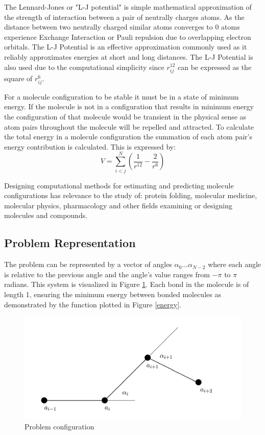 \documentclass[11pt]{article}
\begin{document}
    \par The Lennard-Jones or "L-J potential" is simple mathematical approximation of the strength of interaction between a pair of neutrally charges atoms. As the distance between two neutrally charged similar atoms converges to 0 atoms experience Exchange Interaction or Pauli repulsion due to overlapping electron orbitals. The L-J Potential is an effective approximation commonly used as it reliably approximates energies at short and long distances. The L-J Potential is also used due to the computational simplicity since $r_{ij}^{12}$ can be expressed as the square of $r_{ij}^6$.
    
    \par For a molecule configuration to be stable it must be in a state of minimum energy. If the molecule is not in a configuration that results in minimum energy the configuration of that molecule would be transient in the physical sense as atom pairs throughout the molecule will be repelled and attracted. To calculate the total energy in a molecule configuration the summation of each atom pair's energy contribution is calculated. This is expressed by:
    \begin{equation}
        V = \sum_{i < j}^{N}(\frac{1}{r^{12}} - \frac{2}{r^{6}})
    \end{equation}

    Designing computational methods for estimating and predicting molecule configurations has relevance to the study of: protein folding, molecular medicine, molecular physics, pharmacology and other fields examining or designing molecules and compounds.

    \subsection{Problem Representation}
    \par
    The problem can be represented by a vector of angles $\alpha_{0} ... \alpha_{N-2}$ where each angle is relative to the previous angle and the angle's value ranges from $-\pi$ to $\pi$ radians. This system is visualized in Figure \ref{atom configuration}. Each bond in the molecule is of length 1, ensuring the minimum energy between bonded molecules as demonstrated by the function plotted in Figure \ref{energy}.

    \begin{figure}[h]
        \includegraphics[scale=0.45]{configuration}
        \caption{Problem configuration}
        \label{atom configuration}
    \end{figure}
    
\end{document}
